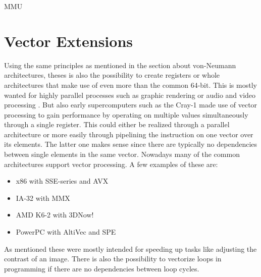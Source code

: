 MMU

\section{Vector Extensions}

Using the same principles as mentioned in the section about von-Neumann architectures, theses is also the possibility to create registers or whole architectures that make use of even more than the common 64-bit.
This is mostly wanted for highly parallel processes such as graphic rendering or audio and video processing .
But also early supercomputers such as the Cray-1  made use of vector processing to gain performance by operating on multiple values  simultaneously through a single register.
This could either be realized through a parallel architecture or more easily through pipelining the instruction on one vector over its elements.
The latter one makes sense since there are typically no dependencies between single elements in the same vector.
Nowadays many of the common architectures support vector processing.
A few examples of these are:
\begin{itemize}
    \item x86 with SSE-series and AVX
    \item IA-32 with MMX
    \item AMD K6-2 with 3DNow!
    \item PowerPC with AltiVec and SPE
\end{itemize}
As mentioned these were mostly intended for speeding up tasks like adjusting the contrast of an image.
There is also the possibility to vectorize loops in programming if there are no dependencies between loop cycles.
    

